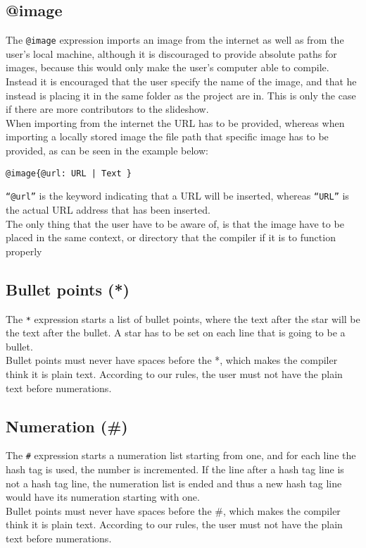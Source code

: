 \subsection{@image}
The \texttt{@image} expression imports an image from the internet as well as from the user's local machine, although it is discouraged to provide absolute paths for images, because this would only make the user's computer able to compile. Instead it is encouraged that the user specify the name of the image, and that he instead is placing it in the same folder as the project are in. This is only the case if there are more contributors to the slideshow.\\
When importing from the internet the URL has to be provided, whereas when importing a locally stored image the file path that specific image has to be provided, as can be seen in the example below:
\begin{lstlisting}[frame=single]
@image{@url: URL | Text }
\end{lstlisting}
\texttt{``@url''} is the keyword indicating that a URL will be inserted, whereas \texttt{``URL''} is the actual URL address that has been inserted. \\
The only thing that the user have to be aware of, is that the image have to be placed in the same context, or directory that the compiler if it is to function properly

\subsection{Bullet points (*)}
The \texttt{*} expression starts a list of bullet points, where the text after the star will be the text after the bullet.
A star has to be set on each line that is going to be a bullet. \\
Bullet points must never have spaces before the *, which makes the compiler think it is plain text. According to our rules, the user must not have the plain text before numerations.

\subsection{Numeration (\#)}
The \texttt{\#} expression starts a numeration list starting from one, and for each line the hash tag is used, the number is incremented. If the line after a hash tag line is not a hash tag line, the numeration list is ended and thus a new hash tag line would have its numeration starting with one. \\
Bullet points must never have spaces before the \#, which makes the compiler think it is plain text. According to our rules, the user must not have the plain text before numerations.

